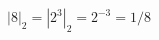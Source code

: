 \documentclass[preview]{standalone}
\begin{document}
\begin{align*}
|8|_2 = |2^3|_2 = 2^{-3} = 1/8
\end{align*}
\end{document}
